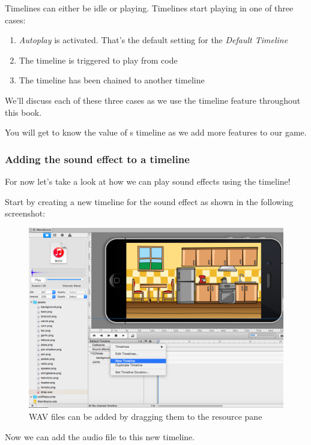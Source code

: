 Timelines can either be idle or playing. Timelines start playing in one of three
cases:
\begin{enumerate}
  \item \textit{Autoplay} is activated. That's the default setting for the
  \textit{Default Timeline}
  \item The timeline is triggered to play from code
  \item The timeline has been chained to another timeline
\end{enumerate}

We'll discuss each of these three cases as we use the timeline feature
throughout this book. 

You will get to know the value of \SB{}s timeline as we add more features to our
game.

\subsubsection{Adding the sound effect to a timeline}
For now let's take a look at how we can play sound effects using the timeline!

\begin{leftbar}
Start by creating a new timeline for the sound effect as shown in the following
screenshot: 

\begin{figure}[H]
    \centering
    \includegraphics[width=0.8\linewidth]{images/Chapter2/new_timeline_audio.png}
    \caption{WAV files can be added by dragging them to the resource
    pane}\label{fig:audio_new_timeline}
\end{figure}
\end{leftbar}

Now we can add the audio file to this new timeline.

